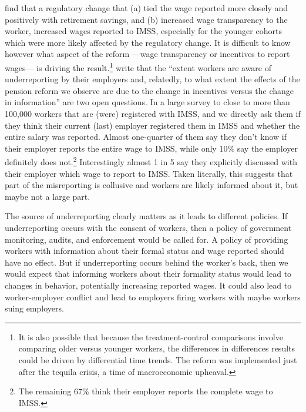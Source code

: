 \documentclass[oneside,11pt]{article}
\begin{document}
\cite{kumler2020enlisting} find that a regulatory change that (a) tied the wage reported more closely and positively with retirement savings, and (b) increased wage transparency to the worker, increased wages reported to IMSS, especially for the younger cohorts which were more likely affected by the regulatory change. %
It is difficult to know however what aspect of the reform ---wage transparency or incentives to report wages--- is driving the result.\footnote{It is also possible that because the treatment-control comparisons involve comparing older versus younger workers, the differences in differences results could be driven by differential time trends. The reform was implemented just after the tequila crisis, a time of macroeconomic upheaval.} %
\cite{kumler2020enlisting} write that the  ``extent workers are aware of underreporting by their employers and, relatedly, to what extent the effects of the pension reform we observe are due to the change in incentives versus the change in information'' are two open questions.  In a large survey to close to more than 100,000 workers that are (were) registered with IMSS, and we directly ask them if they think their current (last) employer registered them in IMSS and whether the entire salary was reported. Almost one-quarter of them say they don't know if their employer reports the entire wage to IMSS, while only 10\% say the employer definitely does not.\footnote{The remaining $67\%$ think their employer reports the complete wage to IMSS.} Interestingly almost 1 in 5 say they explicitly discussed with their employer which wage to report to IMSS. Taken literally, this suggests that part of the misreporting is collusive and workers are likely informed about it, but maybe not a large part. 

The source of underreporting clearly matters as it leads to different policies. If underreporting occurs with the consent of workers, then a policy of government monitoring, audits, and enforcement would be called for. A policy of providing workers with information about their formal status and wage reported should have no effect. But if underreporting occurs behind the worker's back, then we would expect that informing workers about their formality status would lead to changes in behavior, potentially increasing reported wages. It could also lead to worker-employer conflict and lead to employers firing workers with maybe workers suing employers.  
\end{document}
